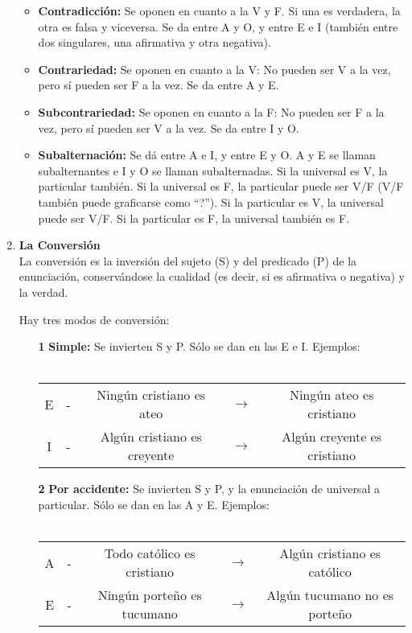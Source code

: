 \documentclass{article}
\begin{document}
\begin{enumerate}
    \begin{itemize}
        \item \textbf{Contradicción:} Se oponen en cuanto a la V y F. Si una es verdadera, la otra es falsa y viceversa. Se da entre A y O, y entre E e I (también entre dos singulares, una afirmativa y otra negativa). 
        \item \textbf{Contrariedad:} Se oponen en cuanto a la V: No pueden ser V a la vez, pero sí pueden ser F a la vez. Se da entre A y E.
        \item \textbf{Subcontrariedad:} Se oponen en cuanto a la F: No pueden ser F a la vez, pero sí pueden ser V a la vez. Se da entre I y O.
        \item \textbf{Subalternación:} Se dá entre A e I, y entre E y O. A y E se llaman subalternantes e I y O se llaman subalternadas. Si la universal es V, la particular también. Si la universal es F, la particular puede ser V/F (V/F también puede graficarse como ``?''). Si la particular es V, la universal puede ser V/F. Si la particular es F, la universal también es F.
        \end{itemize}

    \item \textbf{La Conversión} \\
    La conversión es la inversión del sujeto (S) y del predicado (P) de la enunciación, conservándose la cualidad (es decir, si es afirmativa o negativa) y la verdad. \par 
    Hay tres modos de conversión:
    
    \begin{itemize}
        \item[\textbf{1}] \textbf{Simple:} Se invierten S y P. Sólo se dan en las E e I. Ejemplos: \\ \vspace{-1mm} \\
        \begin{tabular}{c c c c c}
            E & - & Ningún cristiano es ateo    & $\longrightarrow$ & Ningún ateo es cristiano \\
            I & - & Algún cristiano es creyente & $\longrightarrow$ & Algún creyente es cristiano
        \end{tabular}
        
        \item[\textbf{2}] \textbf{Por accidente:} Se invierten S y P, y la enunciación de universal a particular. Sólo se dan en las A y E. Ejemplos: \\ \vspace{-1mm} \\
        \begin{tabular}{c c c c c}
            A & - & Todo católico es cristiano & $\longrightarrow$ & Algún cristiano es católico \\
            E & - & Ningún porteño es tucumano & $\longrightarrow$ & Algún tucumano no es porteño
        \end{tabular}
        

\end{itemize}
\end{enumerate}
\end{document}
